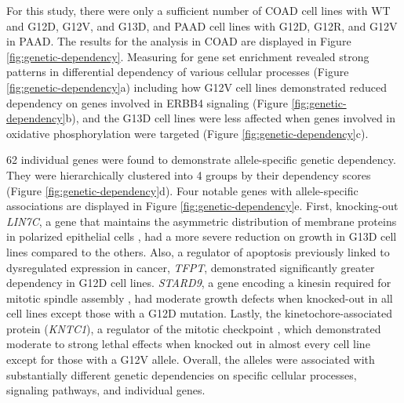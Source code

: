 For this study, there were only a sufficient number of COAD cell lines with WT \KRAS{} and \KRAS{} G12D, G12V, and G13D, and PAAD cell lines with G12D, G12R, and G12V in PAAD.
The results for the analysis in COAD are displayed in Figure \ref{fig:genetic-dependency}.
Measuring for gene set enrichment revealed strong patterns in differential dependency of various cellular processes (Figure \ref{fig:genetic-dependency}a) including how \KRAS{} G12V cell lines demonstrated reduced dependency on genes involved in ERBB4 signaling (Figure \ref{fig:genetic-dependency}b), and the \KRAS{} G13D cell lines were less affected when genes involved in oxidative phosphorylation were targeted (Figure \ref{fig:genetic-dependency}c).

62 individual genes were found to demonstrate \KRAS{} allele-specific genetic dependency.
They were hierarchically clustered into 4 groups by their dependency scores (Figure \ref{fig:genetic-dependency}d).
Four notable genes with allele-specific associations are displayed in Figure \ref{fig:genetic-dependency}e.
First, knocking-out \emph{LIN7C}, a gene that maintains the asymmetric distribution of membrane proteins in polarized epithelial cells \cite{Monastyrskaya2013MiR-199a-5pSyndrome}, had a more severe reduction on growth in \KRAS{ } G13D cell lines compared to the others.
Also, a regulator of apoptosis previously linked to dysregulated expression in cancer, \emph{TFPT}, demonstrated significantly greater dependency in G12D cell lines.
\emph{STARD9}, a gene encoding a kinesin required for mitotic spindle assembly \cite{Torres2011TheAssembly}, had moderate growth defects when knocked-out in all cell lines except those with a \KRAS{} G12D mutation.
Lastly, the kinetochore-associated protein (\emph{KNTC1}), a regulator of the mitotic checkpoint \cite{Chan2000HumanKinetochores., Scaerou2001TheKinetochore., Kops2005ZW10Kinetochore.}, which demonstrated moderate to strong lethal effects when knocked out in almost every cell line except for those with a \KRAS{} G12V allele.
Overall, the \KRAS{} alleles were associated with substantially different genetic dependencies on specific cellular processes, signaling pathways, and individual genes.


